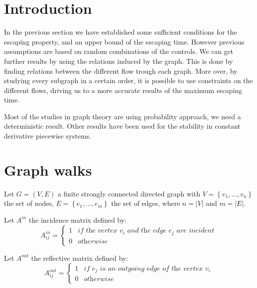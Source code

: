 \documentclass{article}
\begin{document}
\section*{Introduction}
In the previous section we have established some sufficient conditions for the escaping property, and an upper bound of the escaping time.
However previous assumptions are based on random combinations of the controls. We can get further results by using the relations induced by the graph.
This is done by finding relations between the different flow trough each graph.
More over, by studying every subgraph in a certain order, it is possible to use constraints on the different flows, driving us to a more accurate results of the maximum escaping time.

Most of the studies in graph theory are using probability approach, we need a deterministic result.
Other results have been used for the stability in constant derivative piecewise systems.


\section{Graph walks}
Let $G = \left(V,E\right)$ a finite strongly connected directed graph with 
$V = \left \{ v_1, \dots,v_n \right \}$
the set of nodes, $E = \left \{ e_1,...,e_m\right \}$ the set of edges, where $n = \left | V \right |$ and $m = \left | E \right |$.

\begin{nameddefinition}
Let $A^{in}$ the incidence matrix defined by:
\begin{equation}
A^{in}_{ij} = \left \{
\begin{array}{ll}
1 & \textit{if the vertex $v_i$ and the edge $e_j$ are incident}\\
0 & \textit{otherwise}
\end{array}
\right .
\end{equation} 
\end{nameddefinition}

\begin{nameddefinition}
Let $A^{out}$ the reflective matrix defined by:
\begin{equation}
A^{out}_{ij} = \left \{
\begin{array}{ll}
1 & \textit{if $e_j$ is an outgoing edge of the vertex $v_i$}\\
0 & \textit{otherwise}
\end{array}
\right .
\end{equation} 
\end{nameddefinition}
\end{document}

